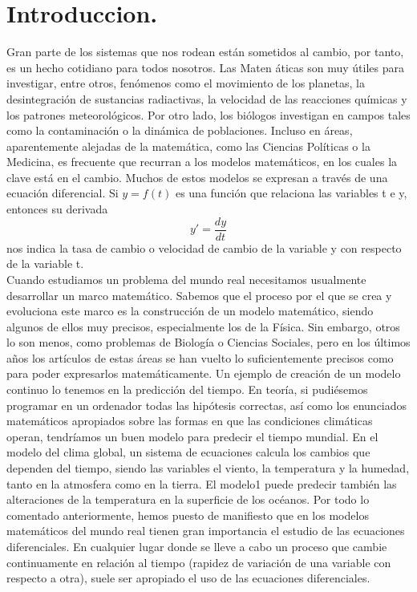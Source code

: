 \documentclass[12pt,a4paper]{article}
\begin{document}
\section{Introduccion. }
Gran parte de los sistemas que nos rodean están sometidos al cambio, por tanto, es un hecho cotidiano para todos nosotros. Las Maten áticas son muy útiles para investigar, entre otros, fenómenos como el movimiento de los planetas, la desintegración de sustancias radiactivas, la velocidad de las reacciones químicas y los patrones meteorológicos. Por otro lado, los biólogos investigan en campos tales como la contaminación o la dinámica de poblaciones. Incluso en áreas, aparentemente alejadas de la matemática, como las Ciencias Políticas o la Medicina, es frecuente que recurran a los modelos matemáticos, en los cuales la clave está en el cambio. Muchos de estos modelos se expresan a través de una ecuación diferencial. Si $ y = f(t)$
es una función que relaciona las variables t e y, entonces su derivada
\begin{equation}
  y'= \frac{dy}{dt}
\end{equation}  
nos indica la tasa de cambio o velocidad de cambio de la variable y con respecto de la variable t.\\
Cuando estudiamos un problema del mundo real necesitamos usualmente desarrollar un marco matemático. Sabemos que el proceso por el que se crea y evoluciona este marco es la construcción de un modelo matemático, siendo algunos de ellos muy precisos, especialmente los de la Física. Sin embargo, otros lo son menos, como problemas de Biología o Ciencias Sociales, pero en los últimos años los artículos de estas áreas se han vuelto lo suficientemente precisos como para poder expresarlos matemáticamente.\vspace{0.5cm}
Un ejemplo de creación de un modelo continuo lo tenemos en la predicción del tiempo. En teoría, si pudiésemos programar en un ordenador todas las hipótesis correctas, así como los enunciados matemáticos apropiados sobre las formas en que las condiciones climáticas operan, tendríamos un buen modelo para predecir el tiempo mundial. En el modelo del clima global, un sistema de ecuaciones calcula los cambios que dependen del tiempo, siendo las variables el viento, la temperatura y la humedad, tanto en la atmosfera como en la tierra. El modelo1 puede predecir también las alteraciones de la temperatura en la superficie de los océanos.\vspace{0.5cm} 
Por todo lo comentado anteriormente, hemos puesto de manifiesto que en los modelos matemáticos del mundo real tienen gran importancia el estudio de las ecuaciones diferenciales. En cualquier lugar donde se lleve a cabo un proceso que cambie continuamente en relación al tiempo (rapidez de variación de una variable con respecto a otra), suele ser apropiado el uso de las ecuaciones diferenciales.\vspace{0.5cm}
\end{document}
